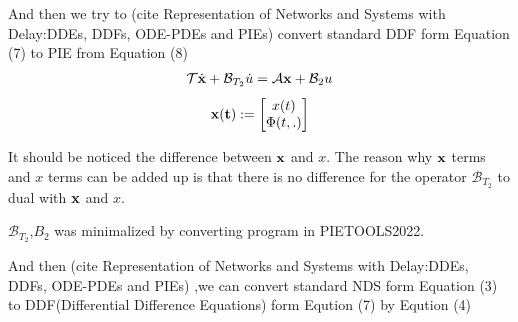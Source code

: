 \documentclass[twocolumn]{autart}    %
\begin{document}
\begin{lem}
    
And then we try to (cite Representation of Networks and Systems with Delay:DDEs, DDFs, ODE-PDEs and PIEs) convert standard DDF form Equation (7) to PIE from Equation (8) 
\begin{equation}
    \begin{aligned}
        \setlength{\arraycolsep}{0.9pt}
        \mathcal{T}\dot{\bold{x}}+\mathcal{B}_{T_{2}}\dot{u} = \mathcal{A}\bold{x}+\mathcal{B}_{2}u
    \end{aligned}
\end{equation}
\begin{equation}
    \begin{aligned}
        \setlength{\arraycolsep}{0.9pt}
        \bold{x(t)} := \begin{bmatrix}
            x(t) \\
            \Phi(t,.)
        \end{bmatrix}\nonumber
    \end{aligned}
\end{equation}
\end{lem}
\begin{rmk}
    It should be noticed the difference between $\bold{x}$ and $x$.
The reason why $\bold{x}$ terms and $x$ terms can be added up is that there is no difference
for the operator $\mathcal{B}_{T_{2}}$ to dual with $\bold{x}$ and $x$.
\end{rmk}


\begin{rmk}
    $\mathcal{B}_{T_{2}}$,$B_{2}$ was minimalized by converting program in PIETOOLS2022.  
\end{rmk}



And then (cite Representation of Networks and Systems with Delay:DDEs, DDFs, ODE-PDEs and PIEs) ,we can convert standard NDS form Equation (3) to DDF(Differential Difference Equations) form Eqution (7) by Eqution (4)
\end{document}
